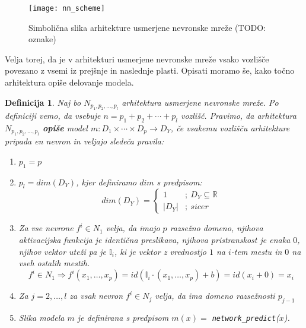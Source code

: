 \documentclass[12pt,a4paper]{article}
\newtheorem{definicija}{Definicija}
\begin{document}
\begin{figure}[h!]

\begin{center}
\texttt{[image: nn\_scheme]}
\end{center}

\caption{Simbolična slika arhitekture usmerjene nevronske mreže (TODO: oznake)}
\end{figure}

Velja torej, da je v arhitekturi usmerjene nevronske mreže vsako vozlišče povezano z vsemi iz prejšnje in naslednje plasti. 
Opisati moramo še, kako točno arhitektura opiše delovanje modela.

\begin{definicija}

Naj bo $N_{p_1,p_2,\ldots,p_l}$ arhitektura usmerjene nevronske mreže. Po definiciji vemo, da vsebuje $n= p_1+p_2+\cdots+p_l$ vozlišč. Pravimo, da arhitektura $N_{p_1,p_2,\ldots,p_l}$ \textbf{opiše} model $m: D_1 \times \cdots \times D_p \rightarrow D_Y$, če vsakemu vozlišču arhitekture pripada en nevron in veljajo sledeča pravila:

\begin{enumerate}
  \item $ p_1 = p$

  \item $p_l = dim(D_Y)$, kjer definiramo $dim$ s predpisom:
  \[
	  dim(D_Y) =
	  \begin{cases}
		1 &;\ D_Y \subseteq \mathbb{R} \\
		|D_Y| &;\ sicer
	  \end{cases}	
  \]%

  \item Za vse nevrone $f^i \in N_1$ velja, da imajo $p$ razsežno domeno, njihova aktivacijska funkcija je identična preslikava, njihova pristranskost je enaka $0$, njihov vektor uteži pa je $\mathbb{I}_i$, ki je vektor z vrednostjo $1$ na $i$-tem mestu in $0$ na vseh ostalih mestih.
$$
f^i \in N_1 \Rightarrow f^i(x_1,\ldots,x_p) = id(\mathbb{I}_i \cdot (x_1,\ldots,x_p) + b) = id(x_i+0) = x_i
$$
  \item Za $j=2,\ldots,l$ za vsak nevron $f^i \in N_j$ velja, da ima domeno razsežnosti $p_{j-1}$

  \item Slika modela $m$ je definirana s predpisom $m(x) =$ \texttt{network\_predict}($x$).


\end{enumerate}
\end{definicija}
\end{document}
